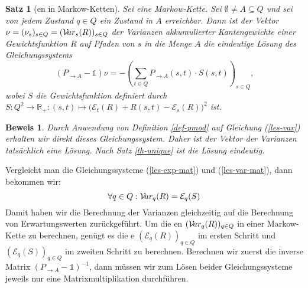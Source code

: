 \documentclass[a4paper]{article}
\newcommand{\mc}{Markow-Kette}
\newtheorem{satz}{Satz}[section] %
\theoremstyle{nonumberplain}
\newtheorem{beweis}{Beweis}
\begin{document}
	\begin{satz}[\var{}en in \mc{}n] \label{th-var}
		Sei \mcex{} eine \mc{}. Sei $\emptyset \neq A\subseteq Q$ und sei von jedem Zustand $q\in Q$ ein Zustand in $A$ erreichbar. Dann ist der Vektor $\nu = (\nu_s)_{s \in Q } = (\mathcal{V}\!ar_{s}(R))_{s \in Q }$ der Varianzen akkumulierter Kantengewichte einer Gewichtsfunktion $R$ auf Pfaden von $s$ in die Menge $A$ die eindeutige Lösung des Gleichungssystems	
		\begin{equation}
		(P_{\rightarrow A} - \mathbb{1}) \nu = - \left(\sum_{t \in Q}{ P_{\rightarrow A}(s,t) \cdot S(s,t) }\right)_{s \in Q}\text{,}\label{les-var-mat}
		\end{equation}
		wobei $S$ die Gewichtsfunktion definiert durch $S: Q^2 \to \mathbb{R}_+ : (s,t) \mapsto \big(\mathcal{E}_{t}(R) + R(s,t) - \mathcal{E}_{s}(R)\big)^2$ ist.
	\end{satz}
	\begin{beweis}
		Durch Anwendung von Definition \ref{def-pmod} auf Gleichung (\ref{les-var}) erhalten wir direkt dieses Gleichungssystem. Daher ist der Vektor der Varianzen tatsächlich eine Lösung. Nach Satz \ref{th-unique} ist die Lösung eindeutig.
	\end{beweis}
	
	Vergleicht man die Gleichungssysteme (\ref{les-exp-mat}) und (\ref{les-var-mat}), dann bekommen wir:
	\begin{equation}
	\forall q \in Q : \mathcal{V}\!ar_q(R) = \mathcal{E}_q(S)
	\end{equation}
	Damit haben wir die Berechnung der Varianzen gleichzeitig auf die Berechnung von Erwartungswerten zurückgeführt. Um die \var{}en $(\mathcal{V}\!ar_q(R))_{q\in Q}$ in einer \mc{} zu berechnen, genügt es die \expect{}e $(\mathcal{E}_q(R))_{q\in Q}$ im ersten Schritt und $(\mathcal{E}_q(S))_{q\in Q}$ im zweiten Schritt zu berechnen. 
	Berechnen wir zuerst die inverse Matrix $(P_{\rightarrow A} - \mathbb{1})^{-1}$, dann müssen wir zum Lösen beider Gleichungssysteme jeweils nur eine Matrixmultiplikation durchführen.
	
\end{document}

